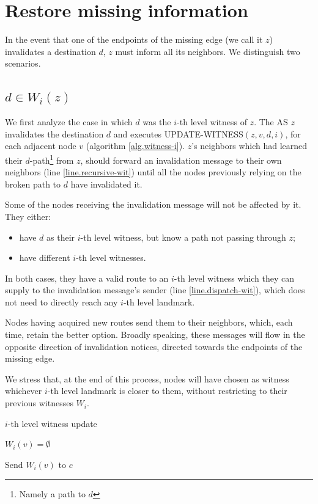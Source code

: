\documentclass[a4paper,11pt,oneside]{report}
\begin{document}
\section{Restore missing information}
\label{sec.tz-restoration}
In the event that one of the endpoints of the missing edge (we call it $z$) invalidates a destination $d$, $z$ must inform all its neighbors. We distinguish two scenarios.

\subsection{$d \in W_i(z)$}
We first analyze the case in which $d$ was the $i$-th level witness of $z$. The AS $z$ invalidates the destination $d$ and executes \textsc{UPDATE-WITNESS}$(z, v, d, i)$, for each adjacent node $v$ (algorithm \ref{alg.witness-i}).
$z$'s neighbors which had learned their $d$-path\footnote{Namely a path to $d$} from $z$, should forward an invalidation message to their own neighbors (line \ref{line.recursive-wit}) until all the nodes previously relying on the broken path to $d$ have invalidated it.

Some of the nodes receiving the invalidation message will not be affected by it. They either:
\begin{itemize}
\item have $d$ as their $i$-th level witness, but know a path not passing through $z$;
\item have different $i$-th level witnesses.
\end{itemize}
In both cases, they have a valid route to an $i$-th level witness which they can supply to the invalidation message's sender (line \ref{line.dispatch-wit}), which does not need to directly reach any $i$-th level landmark.

\bigskip
Nodes having acquired new routes send them to their neighbors, which, each time, retain the better option. Broadly speaking, these messages will flow in the opposite direction of invalidation notices, directed towards the endpoints of the missing edge.

We stress that, at the end of this process, nodes will have chosen as witness whichever $i$-th level landmark is closer to them, without restricting to their previous witnesses $W_i$.

\begin{algorithm}
\caption{$i$-th level witness update} \label{alg.witness-i}
\begin{algorithmic}[1]
	\State
		\State $W_i(v) = \emptyset$ 
		
		 
			\State {} \label{line.recursive-wit}
		\EndFor
	\Else
		\State Send $W_i(v)$ to $c$ \label{line.dispatch-wit}
	\EndIf
	\State
\EndFunction
\end{algorithmic}
\end{algorithm}
\end{document}
